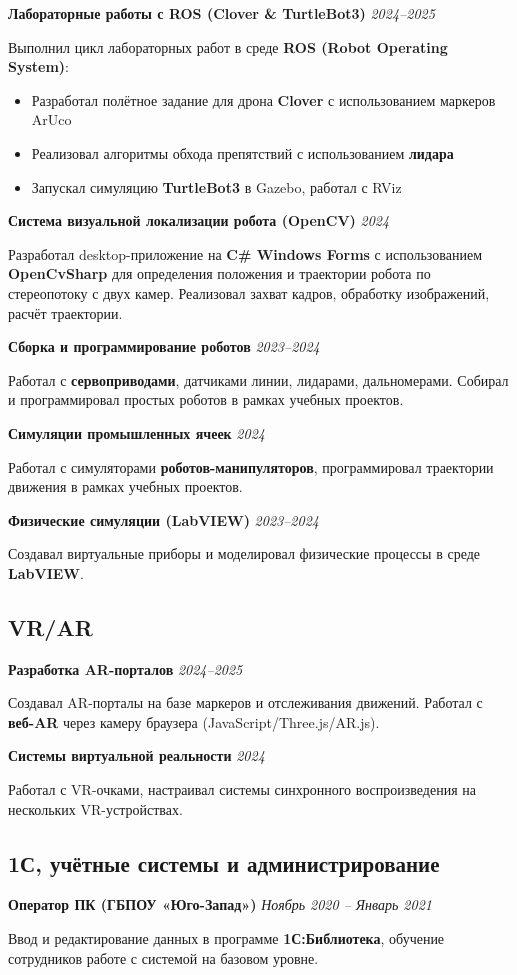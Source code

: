\documentclass[10pt,a4paper]{article}
\newcommand{\projectEntry}[3]{\textbf{#1} \hfill \textit{#2}\par #3\par\vspace{0.3em}}
\begin{document}
\projectEntry{Лабораторные работы с ROS (Clover \& TurtleBot3)}{2024–2025}
{Выполнил цикл лабораторных работ в среде \textbf{ROS (Robot Operating System)}:
\begin{itemize}
    \item Разработал полётное задание для дрона \textbf{Clover} с использованием маркеров ArUco
    \item Реализовал алгоритмы обхода препятствий с использованием \textbf{лидара}
    \item Запускал симуляцию \textbf{TurtleBot3} в Gazebo, работал с RViz
\end{itemize}}

\projectEntry{Система визуальной локализации робота (OpenCV)}{2024}
{Разработал desktop-приложение на \textbf{C\# Windows Forms} с использованием \textbf{OpenCvSharp} для определения положения и траектории робота по стереопотоку с двух камер. Реализовал захват кадров, обработку изображений, расчёт траектории.}

\projectEntry{Сборка и программирование роботов}{2023–2024}
{Работал с \textbf{сервоприводами}, датчиками линии, лидарами, дальномерами. Собирал и программировал простых роботов в рамках учебных проектов.}

\projectEntry{Симуляции промышленных ячеек}{2024}
{Работал с симуляторами \textbf{роботов-манипуляторов}, программировал траектории движения в рамках учебных проектов.}

\projectEntry{Физические симуляции (LabVIEW)}{2023–2024}
{Создавал виртуальные приборы и моделировал физические процессы в среде \textbf{LabVIEW}.}

\subsection{VR/AR}

\projectEntry{Разработка AR-порталов}{2024–2025}
{Создавал AR-порталы на базе маркеров и отслеживания движений. Работал с \textbf{веб-AR} через камеру браузера (JavaScript/Three.js/AR.js).}

\projectEntry{Системы виртуальной реальности}{2024}
{Работал с VR-очками, настраивал системы синхронного воспроизведения на нескольких VR-устройствах.}

\subsection{1С, учётные системы и администрирование}

\projectEntry{Оператор ПК (ГБПОУ «Юго-Запад»)}{Ноябрь 2020 – Январь 2021}
{Ввод и редактирование данных в программе \textbf{1С:Библиотека}, обучение сотрудников работе с системой на базовом уровне.}
\end{document}
